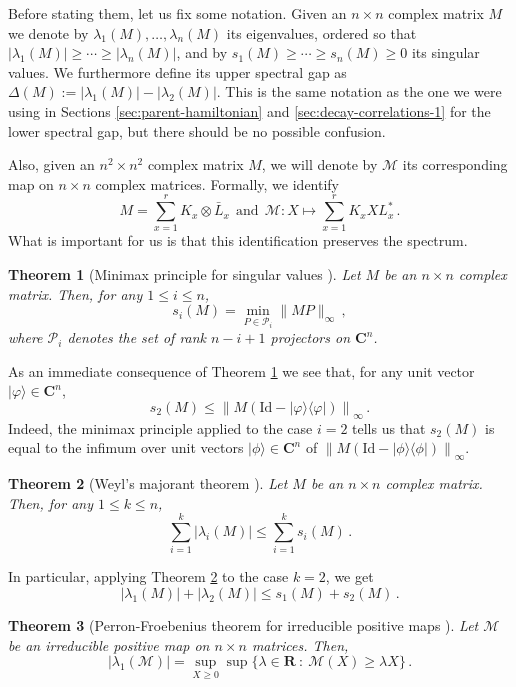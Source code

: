 \documentclass{amsart}
\newtheorem{theorem}{Theorem}[section]
\newcommand{\R}{\mathbf{R}}
\newcommand{\C}{\mathbf{C}}
\renewcommand{\leq}{\leqslant}
\renewcommand{\geq}{\geqslant}
\newcommand{\st}{\  : \ }
\newcommand{\Id}{\mathrm{Id}}
\newcommand{\ketbra}[2]{| #1 \rangle\!\langle #2 |}
\newcommand{\ket}[1]{| #1 \rangle}
\begin{document}
Before stating them, let us fix some notation. Given an $n\times n$ complex matrix $M$ we denote by $\lambda_1(M),\ldots,\lambda_n(M)$ its eigenvalues, ordered so that $|\lambda_1(M)| \geq\cdots\geq |\lambda_n(M)|$, and by $s_1(M) \geq\cdots\geq s_n(M)\geq 0$ its singular values. We furthermore define its upper spectral gap as $\Delta(M):=|\lambda_1(M)|-|\lambda_2(M)|$. This is the same notation as the one we were using in Sections \ref{sec:parent-hamiltonian} and \ref{sec:decay-correlations-1} for the lower spectral gap, but there should be no possible confusion.

Also, given an $n^2\times n^2$ complex matrix $M$, we will denote by $\mathcal M$ its corresponding map on $n\times n$ complex matrices. Formally, we identify
\[ M=\sum_{x=1}^r K_x\otimes \bar{L}_x \ \ \text{and} \ \ \mathcal M:X\mapsto\sum_{x=1}^r K_x X L_x^* \, . \]
What is important for us is that this identification preserves the spectrum.

\begin{theorem}[Minimax principle for singular values \cite{Bha}] \label{th:Bha1}
    Let $M$ be an $n\times n$ complex matrix. Then, for any $1\leq i \leq n$,
    \[ s_i(M) = \min_{P\in\mathcal{P}_i} \|MP\|_{\infty} \, , \]
    where $\mathcal{P}_i$ denotes the set of rank $n-i+1$ projectors on $\C^n$.
\end{theorem}

As an immediate consequence of Theorem \ref{th:Bha1} we see that, for any unit vector $\ket{\varphi}\in\C^n$,
\[ s_2(M) \leq \left\|M\left(\Id-\ketbra{\varphi}{\varphi}\right)\right\|_{\infty} \, . \]
Indeed, the minimax principle applied to the case $i=2$ tells us that $s_2(M)$ is equal to the infimum over unit vectors $\ket{\phi}\in\C^n$ of $\left\|M\left(\Id-\ketbra{\phi}{\phi}\right)\right\|_{\infty}$.

\begin{theorem}[Weyl's majorant theorem \cite{Bha}] \label{th:Bha2}
    Let $M$ be an $n\times n$ complex matrix. Then, for any $1\leq k \leq n$,
    \[ \sum_{i=1}^k |\lambda_i(M)| \leq \sum_{i=1}^k s_i(M) \, . \]
\end{theorem}

In particular, applying Theorem \ref{th:Bha2} to the case $k=2$, we get
\[ |\lambda_1(M)| + |\lambda_2(M)| \leq s_1(M) + s_2(M) \, . \]

\begin{theorem}[Perron-Froebenius theorem for irreducible positive maps \cite{EHK}] \label{th:PF}
    Let $\mathcal M$ be an irreducible positive map on $n\times n$ matrices. Then,
    \[ |\lambda_1(\mathcal M)| = \underset{X\geq 0}{\sup} \sup \{ \lambda\in\R \st \mathcal M(X) \geq \lambda X \} \, .\]
\end{theorem}
\end{document}
